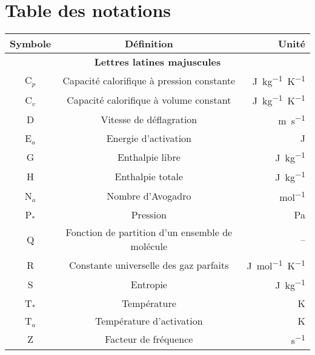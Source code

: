 \chapter*{Table des notations}

\begin{center}


\begin{tabular}{ccr}
\toprule
\toprule
\textbf{Symbole} & \textbf{Définition} & \textbf{Unité} \\ 
\toprule
\toprule
\multicolumn{3}{c}{\textbf{Lettres latines majuscules}} \\
\midrule
C$_p$ & Capacité calorifique à pression constante & \si{\joule.\kilo\gram^{-1}.\kelvin^{-1}}\\

C$_v$ & Capacité calorifique à volume constant & \si{\joule.\kilo\gram^{-1}.\kelvin^{-1}}\\

D & Vitesse de déflagration & \si{\metre.\second^{-1}}\\

E$_{a}$ & Energie d'activation & \si{\joule} \\

G & Enthalpie libre &  \si{\joule.\kilo\gram^{-1}} \\ 

H & Enthalpie totale & \si{\joule.\kilo\gram^{-1}} \\

N$_a$ & Nombre d'Avogadro & \si{\mole^{-1}}\\

P$_{*}$ & Pression & \si{\pascal} \\ 

Q & Fonction de partition d'un ensemble de molécule & -- \\

R & Constante universelle des gaz parfaits & \si{\joule.\mole^{-1}.\kelvin^{-1}}\\ 

S & Entropie & \si{\joule.\kilo\gram^{-1}} \\ 

T$_{*}$ & Température & \si{\kelvin} \\

T$_{a}$ & Température d'activation & \si{\kelvin} \\

Z & Facteur de fréquence & \si{\second^{-1}} \\
 

\end{tabular}
\end{center}
